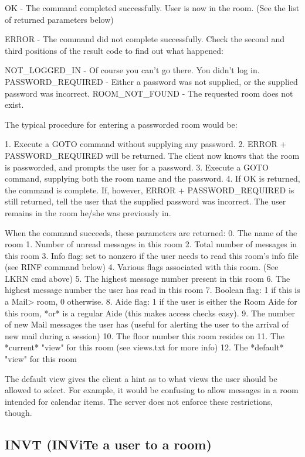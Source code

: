  OK    - The command completed successfully.  User is now in the room.
         (See the list of returned parameters below)

 ERROR - The command did not complete successfully.  Check the second and
third positions of the result code to find out what happened:

   NOT_LOGGED_IN     -  Of course you can't go there.  You didn't log in.
   PASSWORD_REQUIRED -  Either a password was not supplied, or the supplied
password was incorrect.
   ROOM_NOT_FOUND    -  The requested room does not exist.

 The typical procedure for entering a passworded room would be:

 1. Execute a GOTO command without supplying any password.
 2. ERROR + PASSWORD_REQUIRED will be returned.  The client now knows that
the room is passworded, and prompts the user for a password.
 3. Execute a GOTO command, supplying both the room name and the password.
 4. If OK is returned, the command is complete.  If, however,
ERROR + PASSWORD_REQUIRED is still returned, tell the user that the supplied
password was incorrect.  The user remains in the room he/she was previously
in.

 When the command succeeds, these parameters are returned:
   0. The name of the room
   1. Number of unread messages in this room
   2. Total number of messages in this room
   3. Info flag: set to nonzero if the user needs to read this room's info
      file (see RINF command below)
   4. Various flags associated with this room.  (See LKRN cmd above)
   5. The highest message number present in this room
   6. The highest message number the user has read in this room
   7. Boolean flag: 1 if this is a Mail> room, 0 otherwise.
   8. Aide flag: 1 if the user is either the Room Aide for this room, *or* is
a regular Aide (this makes access checks easy).
   9. The number of new Mail messages the user has (useful for alerting the
user to the arrival of new mail during a session)
  10. The floor number this room resides on
  11. The *current* "view" for this room (see views.txt for more info)
  12. The *default* "view" for this room

 The default view gives the client a hint as to what views the user should
be allowed to select.  For example, it would be confusing to allow messages
in a room intended for calendar items.  The server does not enforce these
restrictions, though.



\subsection{INVT (INViTe a user to a room)}

